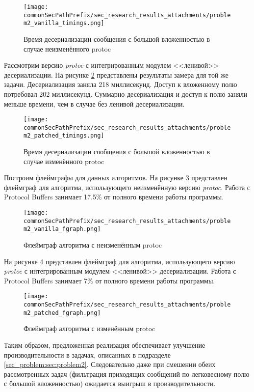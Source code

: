 \begin{figure}[ht]
    \centering
    \texttt{[image: \\commonSecPathPrefix/sec\_research\_results\_attachments/problem2\_vanilla\_timings.png]}
    \caption{Время десериализации сообщения с большой вложенностью в случае неизменённого protoc}
    \label{fig:problem2_vanilla_timings}
\end{figure}

Рассмотрим версию \textit{protoc} с интегрированным модулем <<ленивой>> десериализации.
На рисунке \ref{fig:problem2_patched_timings} представлены результаты замера для той же задачи. Десериализация заняла 218 миллисекунд. Доступ к вложенному полю потребовал 202 миллисекунд. Суммарно десериализация и доступ к полю заняли меньше времени, чем в случае без ленивой десериализации.

\begin{figure}[ht]
    \centering
    \texttt{[image: \\commonSecPathPrefix/sec\_research\_results\_attachments/problem2\_patched\_timings.png]}
    \caption{Время десериализации сообщения с большой вложенностью в случае изменённого protoc}
    \label{fig:problem2_patched_timings}
\end{figure}

Построим флеймграфы для данных алгоритмов.
На рисунке \ref{fig:problem2_vanilla_fgraph} представлен флеймграф для алгоритма, использующего неизменённую версию \textit{protoc}. 
Работа с Protocol Buffers занимает 17.5\% от полного времени работы программы.

\begin{figure}[ht]
    \centering
    \texttt{[image: \\commonSecPathPrefix/sec\_research\_results\_attachments/problem2\_vanilla\_fgraph.png]}
    \caption{Флеймграф алгоритма с неизменённым protoc}
    \label{fig:problem2_vanilla_fgraph}
\end{figure}

На рисунке \ref{fig:problem2_patched_fgraph} представлен флеймграф для алгоритма, использующего версию \textit{protoc} с интегрированным модулем <<ленивой>> десериализации. 
Работа с Protocol Buffers занимает 7\% от полного времени работы программы.

\begin{figure}[ht]
    \centering
    \texttt{[image: \\commonSecPathPrefix/sec\_research\_results\_attachments/problem2\_patched\_fgraph.png]}
    \caption{Флеймграф алгоритма с изменённым protoc}
    \label{fig:problem2_patched_fgraph}
\end{figure}

Таким образом, предложенная реализация обеспечивает улучшение производительности в задачах, описанных в подразделе \ref{sec_problem:sec:problem2}.
Следовательно даже при смешении обеих рассмотренных задач (фильтрация приходящих сообщений по легковесному полю с большой вложенностью) ожидается выигрыш в производительности.
